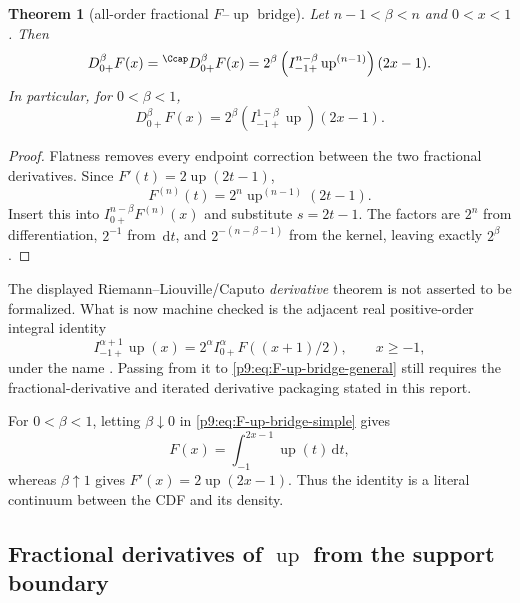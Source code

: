 \documentclass[11pt,oneside]{article}
\newtheorem{theorem}{Theorem}[section]
\theoremstyle{definition}
\theoremstyle{remark}
\newcommand{\Up}{\operatorname{up}}
\newcommand{\dd}{\,\mathrm d}
\newcommand{\1}{\mathbf 1}
\begin{document}
\begin{theorem}[all-order fractional $F$--$\Up$ bridge]
\label{p9:thm:F-up-bridge}
Let $n-1<\beta<n$ and $0<x<1$.  Then
\begin{equation}
 D_{0+}^\beta F(x)
 ={}^{\Ccap}D_{0+}^\beta F(x)
 =2^\beta
   \left(I_{-1+}^{n-\beta}\Up^{(n-1)}\right)(2x-1).
 \label{p9:eq:F-up-bridge-general}
\end{equation}
In particular, for $0<\beta<1$,
\begin{equation}
 D_{0+}^\beta F(x)
 =2^\beta\left(I_{-1+}^{1-\beta}\Up\right)(2x-1).
 \label{p9:eq:F-up-bridge-simple}
\end{equation}
\end{theorem}

\begin{proof}
Flatness removes every endpoint correction between the two fractional
derivatives.  Since $F'(t)=2\Up(2t-1)$,
\begin{equation}
 F^{(n)}(t)=2^n\Up^{(n-1)}(2t-1).
\end{equation}
Insert this into
$I_{0+}^{n-\beta}F^{(n)}(x)$ and substitute $s=2t-1$.  The factors are
$2^n$ from differentiation, $2^{-1}$ from $\dd t$, and
$2^{-(n-\beta-1)}$ from the kernel, leaving exactly $2^\beta$.
\end{proof}

\begin{remark}
The displayed Riemann--Liouville/Caputo \emph{derivative} theorem is not asserted to be
formalized.  What is now machine checked is the adjacent real positive-order integral
identity
\[
 I_{-1+}^{\alpha+1}\Up(x)
 =2^\alpha I_{0+}^{\alpha}F((x+1)/2),\qquad x\ge-1,
\]
under the name .  Passing from it to
\eqref{p9:eq:F-up-bridge-general} still requires the fractional-derivative and iterated
derivative packaging stated in this report.
\end{remark}

\begin{remark}
For $0<\beta<1$, letting $\beta\downarrow0$ in
\cref{p9:eq:F-up-bridge-simple} gives
\[
 F(x)=\int_{-1}^{2x-1}\Up(t)\dd t,
\]
whereas $\beta\uparrow1$ gives $F'(x)=2\Up(2x-1)$.  Thus the identity is a
literal continuum between the CDF and its density.
\end{remark}

\subsection{Fractional derivatives of \texorpdfstring{$\Up$}{up} from the support boundary}
\end{document}
